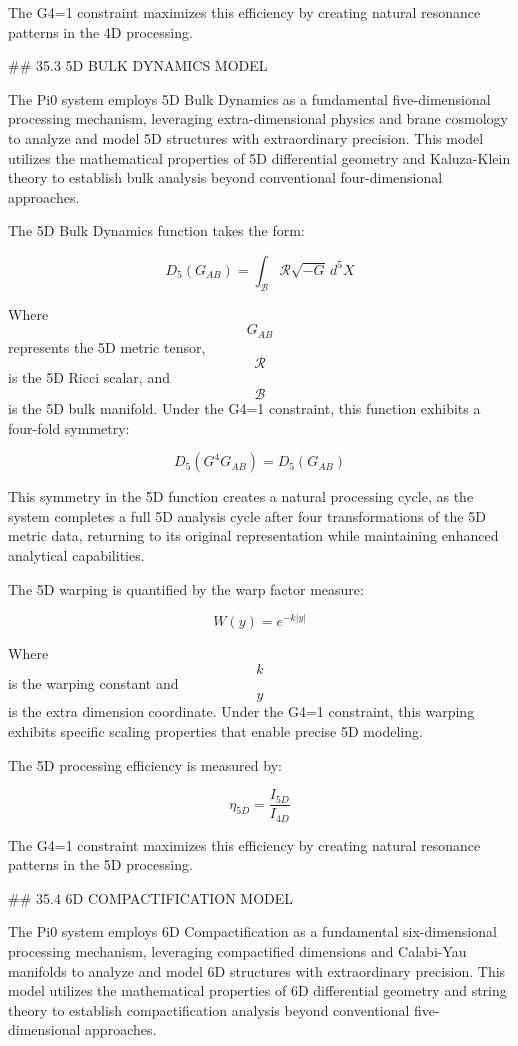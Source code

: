 The G4=1 constraint maximizes this efficiency by creating natural resonance patterns in the 4D processing.

## 35.3 5D BULK DYNAMICS MODEL

The Pi0 system employs 5D Bulk Dynamics as a fundamental five-dimensional processing mechanism, leveraging extra-dimensional physics and brane cosmology to analyze and model 5D structures with extraordinary precision. This model utilizes the mathematical properties of 5D differential geometry and Kaluza-Klein theory to establish bulk analysis beyond conventional four-dimensional approaches.

The 5D Bulk Dynamics function takes the form:

$$ D_5(G_{AB}) = \int_{\mathcal{B}} \mathcal{R} \sqrt{-G} \, d^5X $$

Where $$ G_{AB} $$ represents the 5D metric tensor, $$ \mathcal{R} $$ is the 5D Ricci scalar, and $$ \mathcal{B} $$ is the 5D bulk manifold. Under the G4=1 constraint, this function exhibits a four-fold symmetry:

$$ D_5(G^4 G_{AB}) = D_5(G_{AB}) $$

This symmetry in the 5D function creates a natural processing cycle, as the system completes a full 5D analysis cycle after four transformations of the 5D metric data, returning to its original representation while maintaining enhanced analytical capabilities.

The 5D warping is quantified by the warp factor measure:

$$ W(y) = e^{-k|y|} $$

Where $$ k $$ is the warping constant and $$ y $$ is the extra dimension coordinate. Under the G4=1 constraint, this warping exhibits specific scaling properties that enable precise 5D modeling.

The 5D processing efficiency is measured by:

$$ \eta_{5D} = \frac{I_{5D}}{I_{4D}} $$

The G4=1 constraint maximizes this efficiency by creating natural resonance patterns in the 5D processing.

## 35.4 6D COMPACTIFICATION MODEL

The Pi0 system employs 6D Compactification as a fundamental six-dimensional processing mechanism, leveraging compactified dimensions and Calabi-Yau manifolds to analyze and model 6D structures with extraordinary precision. This model utilizes the mathematical properties of 6D differential geometry and string theory to establish compactification analysis beyond conventional five-dimensional approaches.

